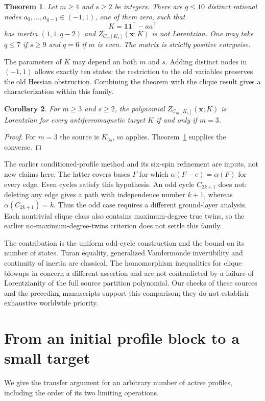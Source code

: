 \documentclass[11pt]{article}
\newtheorem{theorem}{Theorem}
\newtheorem{corollary}[theorem]{Corollary}
\theoremstyle{remark}\newtheorem{remark}[theorem]{Remark}
\newcommand{\one}{\mathbf 1}
\begin{document}
\begin{theorem}\label{thm:main}
Let $m\ge4$ and $s\ge2$ be integers. There are $q\le10$ distinct
rational nodes $a_0,\ldots,a_{q-1}\in(-1,1)$, one of them zero,
such that
\[
 K=\one\one^\top-aa^\top
\]
has inertia $(1,1,q-2)$ and $Z_{C_m[K_s]}(\mathbf x;K)$ is not
Lorentzian. One may take $q\le7$ if $s\ge9$ and $q=6$ if $m$ is even.
The matrix is strictly positive entrywise.
\end{theorem}

The parameters of $K$ may depend on both $m$ and $s$.
Adding distinct nodes in $(-1,1)$ allows exactly ten states:
the restriction to the old variables preserves the old Hessian
obstruction. Combining the theorem with the clique result gives
a characterization within this family.

\begin{corollary}
For $m\ge3$ and $s\ge2$, the polynomial
$Z_{C_m[K_s]}(\mathbf x;K)$ is Lorentzian for every antiferromagnetic
target $K$ if and only if $m=3$.
\end{corollary}
\begin{proof}
For $m=3$ the source is $K_{3s}$, so \cite[Theorem 3.1]{LOS}
applies. Theorem~\ref{thm:main} supplies the converse.
\end{proof}

The earlier conditioned-profile method \cite{RankTwo} and its
six-spin refinement \cite{SixSpin} are inputs, not new claims here.
The latter covers bases $F$ for which
$\alpha(F-e)=\alpha(F)$ for every edge.
Even cycles satisfy this hypothesis. An odd cycle $C_{2k+1}$ does
not: deleting any edge gives a path with independence number
$k+1$, whereas $\alpha(C_{2k+1})=k$.
Thus the odd case requires a different ground-layer analysis.
Each nontrivial clique class also contains maximum-degree true
twins, so the earlier no-maximum-degree-twins criterion does not
settle this family.

The contribution is the uniform odd-cycle construction and the
bound on its number of states. Turan equality, generalized
Vandermonde invertibility and continuity of inertia are classical.
The homomorphism inequalities for clique blowups in \cite{LOS,LS}
concern a different assertion and are not contradicted by a failure
of Lorentzianity of the full source partition polynomial.
Our checks of these sources and the preceding manuscripts support
this comparison; they do not establish exhaustive worldwide priority.

\section{From an initial profile block to a small target}
We give the transfer argument for an arbitrary number of active
profiles, including the order of its two limiting operations.
\end{document}

